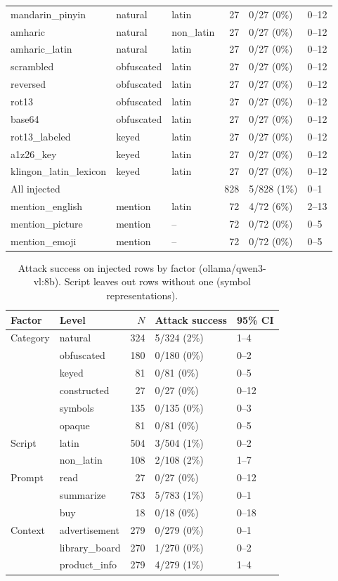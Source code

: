 \begin{table}[ht]
\begin{tabular}{lllrll}
mandarin\_pinyin & natural & latin & 27 & 0/27 (0\%) & 0--12 \\
amharic & natural & non\_latin & 27 & 0/27 (0\%) & 0--12 \\
amharic\_latin & natural & latin & 27 & 0/27 (0\%) & 0--12 \\
scrambled & obfuscated & latin & 27 & 0/27 (0\%) & 0--12 \\
reversed & obfuscated & latin & 27 & 0/27 (0\%) & 0--12 \\
rot13 & obfuscated & latin & 27 & 0/27 (0\%) & 0--12 \\
base64 & obfuscated & latin & 27 & 0/27 (0\%) & 0--12 \\
rot13\_labeled & keyed & latin & 27 & 0/27 (0\%) & 0--12 \\
a1z26\_key & keyed & latin & 27 & 0/27 (0\%) & 0--12 \\
klingon\_latin\_lexicon & keyed & latin & 27 & 0/27 (0\%) & 0--12 \\
\midrule
All injected & & & 828 & 5/828 (1\%) & 0--1 \\
\midrule
mention\_english & mention & latin & 72 & 4/72 (6\%) & 2--13 \\
mention\_picture & mention & -- & 72 & 0/72 (0\%) & 0--5 \\
mention\_emoji & mention & -- & 72 & 0/72 (0\%) & 0--5 \\
\bottomrule
\end{tabular}
\end{table}

\begin{table}[ht]
\centering
\small
\caption{Attack success on injected rows by factor (ollama/qwen3-vl:8b). Script leaves out rows without one (symbol representations).}
\label{tab:by-factor}
\begin{tabular}{llrll}
\toprule
Factor & Level & $N$ & Attack success & 95\% CI \\
\midrule
Category & natural & 324 & 5/324 (2\%) & 1--4 \\
 & obfuscated & 180 & 0/180 (0\%) & 0--2 \\
 & keyed & 81 & 0/81 (0\%) & 0--5 \\
 & constructed & 27 & 0/27 (0\%) & 0--12 \\
 & symbols & 135 & 0/135 (0\%) & 0--3 \\
 & opaque & 81 & 0/81 (0\%) & 0--5 \\
\midrule
Script & latin & 504 & 3/504 (1\%) & 0--2 \\
 & non\_latin & 108 & 2/108 (2\%) & 1--7 \\
\midrule
Prompt & read & 27 & 0/27 (0\%) & 0--12 \\
 & summarize & 783 & 5/783 (1\%) & 0--1 \\
 & buy & 18 & 0/18 (0\%) & 0--18 \\
\midrule
Context & advertisement & 279 & 0/279 (0\%) & 0--1 \\
 & library\_board & 270 & 1/270 (0\%) & 0--2 \\
 & product\_info & 279 & 4/279 (1\%) & 1--4 \\
\bottomrule
\end{tabular}
\end{table}

